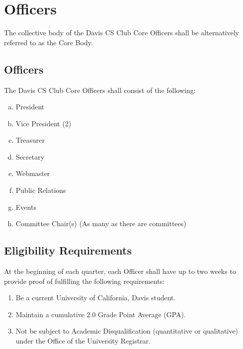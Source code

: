 \documentclass{article}
\newenvironment{li}{
\begin{enumerate}
  \setlength{\itemsep}{1pt}
  \setlength{\parskip}{0pt}
  \setlength{\parsep}{0pt}
}{\end{enumerate}}
\begin{document}
\section{Officers}
The collective body of the Davis CS Club Core Officers shall be alternatively referred to as the Core Body.

\subsection{Officers}
The Davis CS Club Core Officers shall consist of the following:
\begin{enumerate}[a.]
  \setlength{\itemsep}{1pt}
  \setlength{\parskip}{0pt}
  \setlength{\parsep}{0pt}
\item President
\item Vice President (2)
\item Treasurer
\item Secretary
\item Webmaster
\item Public Relations
\item Events
\item Committee Chair(s) (As many as there are committees)
\end{enumerate}

\subsection{Eligibility Requirements}
At the beginning of each quarter, each Officer shall have up to two weeks to provide proof of fulfilling the following requirements:
\begin{li}
\item Be a current University of California, Davis student.
\item Maintain a cumulative 2.0 Grade Point Average (GPA).
\item Not be subject to Academic Disqualification (quantitative or qualitative) under the Office of the University Registrar.
\end{li}
\end{document}
